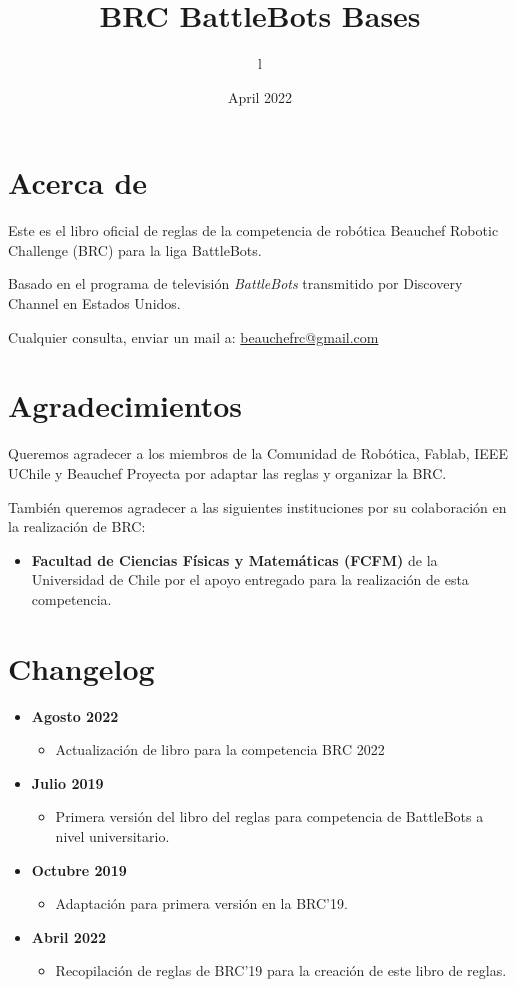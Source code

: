 \documentclass[11pt]{article}
\title{BRC BattleBots Bases}
\author{l}
\date{April 2022}
\begin{document}
\newcommand{\subtitle}{Reglas: Liga BattleBots}



\section*{Acerca de}
Este es el libro oficial de reglas de la competencia de robótica Beauchef Robotic Challenge (BRC) para la liga BattleBots.

Basado en el programa de televisión \emph{BattleBots} transmitido por Discovery Channel en Estados Unidos.

Cualquier consulta, enviar un mail a: \href{mailto:beauchefrc@gmail.com}{beauchefrc@gmail.com}

\section*{Agradecimientos}

Queremos agradecer a los miembros de la Comunidad de Robótica, Fablab, IEEE UChile y Beauchef Proyecta por adaptar las reglas y organizar la BRC.

También queremos agradecer a las siguientes instituciones por su colaboración en la realización de BRC:

\begin{itemize}
   \item \textbf{Facultad de Ciencias Físicas y Matemáticas (FCFM)} de la Universidad de Chile por el apoyo entregado para la realización de esta competencia. 
 \end{itemize} 


\section*{Changelog}
\begin{itemize}
  \item \textbf{Agosto 2022}
    \begin{itemize}
        \item Actualización de libro para la competencia BRC 2022
    \end{itemize}

  \item \textbf{Julio 2019}
    \begin{itemize}
        \item Primera versión del libro del reglas para competencia de BattleBots a nivel universitario.
    \end{itemize}
    
  \item \textbf{Octubre 2019}
    \begin{itemize}
        \item Adaptación para primera versión en la BRC'19.
    \end{itemize}
    
  \item \textbf{Abril 2022}
    \begin{itemize}
        \item Recopilación de reglas de BRC'19 para la creación de este libro de reglas.
    \end{itemize}
\end{itemize}
\end{document}
